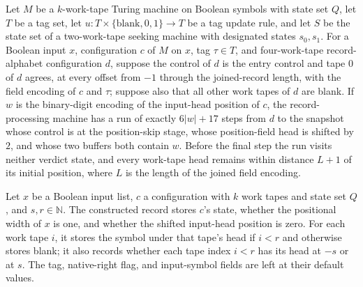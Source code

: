 \begin{theorem}
\label{Turing.recordStep_read_prefix}
\leanok
{}
Let $M$ be a $k$-work-tape Turing machine on Boolean symbols with state set $Q$, let $T$
be a tag set, let $u:T\times\{\text{blank},0,1\}\to T$ be a tag update rule, and let $S$
be the state set of a two-work-tape seeking machine with designated states $s_0,s_1$.
For a Boolean input $x$, configuration $c$ of $M$ on $x$, tag $\tau\in T$, and
four-work-tape record-alphabet configuration $d$, suppose the control of $d$ is the
entry control and tape $0$ of $d$ agrees, at every offset from $-1$ through the
joined-record length, with the field encoding of $c$ and $\tau$; suppose also that all
other work tapes of $d$ are blank. If $w$ is the binary-digit encoding of the input-head
position of $c$, the record-processing machine has a run of exactly $6|w|+17$ steps from
$d$ to the snapshot whose control is at the position-skip stage, whose position-field
head is shifted by $2$, and whose two buffers both contain $w$. Before the final step
the run visits neither verdict state, and every work-tape head remains within distance
$L+1$ of its initial position, where $L$ is the length of the joined field encoding.
\end{theorem}

\begin{definition}
\label{Turing.recordStepReadData}
\leanok
{}
Let $x$ be a Boolean input list, $c$ a configuration with $k$ work tapes and state set
$Q$, and $s,r\in\mathbb{N}$. The constructed record stores $c$'s state, whether the
positional width of $x$ is one, and whether the shifted input-head position is zero. For
each work tape $i$, it stores the symbol under that tape's head if $i<r$ and otherwise
stores blank; it also records whether each tape index $i<r$ has its head at $-s$ or at
$s$. The tag, native-right flag, and input-symbol fields are left at their default
values.
\end{definition}

